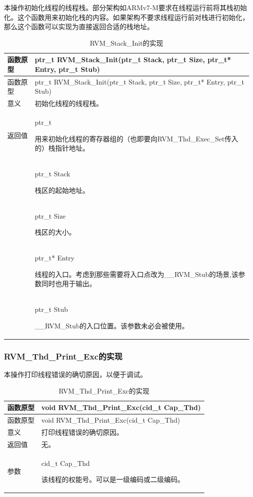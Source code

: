 本操作初始化线程的线程栈。部分架构如ARMv7-M要求在线程运行前将其栈初始化。这个函数用来初始化栈的内容。如果架构不要求线程运行前对栈进行初始化，那么这个函数可以实现为直接返回合适的栈地址。

\begin{xltabular}{\textwidth}{@{}>{\hsize\raggedright\arraybackslash}X>{\hsize\raggedright\arraybackslash}X@{}}
\caption{RVM\_\allowbreak{}Stack\_\allowbreak{}Init的实现}\label{tab:8-15}\\
\toprule
函数原型 & ptr\_\allowbreak{}t RVM\_\allowbreak{}Stack\_\allowbreak{}Init(ptr\_\allowbreak{}t Stack, ptr\_\allowbreak{}t Size, ptr\_\allowbreak{}t*
Entry, ptr\_\allowbreak{}t Stub)\tabularnewline
\endfirsthead
\toprule
函数原型 & ptr\_\allowbreak{}t RVM\_\allowbreak{}Stack\_\allowbreak{}Init(ptr\_\allowbreak{}t Stack, ptr\_\allowbreak{}t Size, ptr\_\allowbreak{}t*
Entry, ptr\_\allowbreak{}t Stub)\tabularnewline
\midrule
\endhead
\bottomrule
\endlastfoot
意义 & 初始化线程的线程栈。\tabularnewline
返回值\strut
 & ptr\_\allowbreak{}t

用来初始化线程的寄存器组的（也即要向RVM\_Thd\_Exec\_Set传入的）栈指针地址。\strut
\tabularnewline
{} & ptr\_\allowbreak{}t Stack

栈区的起始地址。\strut
\tabularnewline
\strut
 & ptr\_\allowbreak{}t Size

栈区的大小。\strut
\tabularnewline
\strut
 & ptr\_\allowbreak{}t* Entry

线程的入口。考虑到那些需要将入口点改为\_\allowbreak{}\_\allowbreak{}RVM\_\allowbreak{}Stub的场景,该参数同时也用于输出。\strut
\tabularnewline
\strut
 & ptr\_\allowbreak{}t Stub

\_\allowbreak{}\_\allowbreak{}RVM\_\allowbreak{}Stub的入口位置。该参数未必会被使用。\strut
\tabularnewline
\end{xltabular}

\subsubsection{RVM\_Thd\_Print\_Exc的实现}\label{subsubsec:8-2-7-3}

本操作打印线程错误的确切原因，以便于调试。

\begin{xltabular}{\textwidth}{@{}>{\hsize\raggedright\arraybackslash}X>{\hsize\raggedright\arraybackslash}X@{}}
\caption{RVM\_\allowbreak{}Thd\_\allowbreak{}Print\_\allowbreak{}Exc的实现}\label{tab:8-16}\\
\toprule
函数原型 & void RVM\_\allowbreak{}Thd\_\allowbreak{}Print\_\allowbreak{}Exc(cid\_\allowbreak{}t Cap\_\allowbreak{}Thd)\tabularnewline
\endfirsthead
\toprule
函数原型 & void RVM\_\allowbreak{}Thd\_\allowbreak{}Print\_\allowbreak{}Exc(cid\_\allowbreak{}t Cap\_\allowbreak{}Thd)\tabularnewline
\midrule
\endhead
\bottomrule
\endlastfoot
意义 & 打印线程错误的确切原因。\tabularnewline
返回值 & 无。\tabularnewline
参数\strut
 & cid\_\allowbreak{}t Cap\_\allowbreak{}Thd

该线程的权能号。可以是一级编码或二级编码。\strut
\tabularnewline
\end{xltabular}


